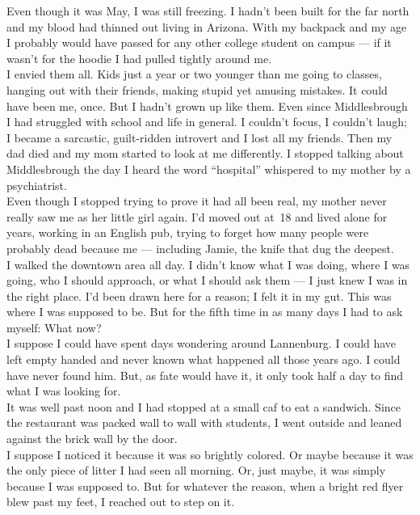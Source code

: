 \documentclass[a5paper]{scrartcl}
\begin{document}
Even though it was May, I was still freezing. I hadn't been built for the far north and my blood had thinned out living in Arizona. With my backpack and my age I probably would have passed for any other college student on campus --- if it wasn't for the hoodie I had pulled tightly around me.\\


I envied them all. Kids just a year or two younger than me going to classes, hanging out with their friends, making  stupid yet amusing mistakes. It could have been me, once. But I hadn't grown up like them. Even since Middlesbrough I had struggled with school and life in general. I couldn't focus, I couldn't laugh; I became a sarcastic, guilt-ridden introvert and I lost all my friends. Then my dad died and my mom started to look at me differently. I stopped talking about Middlesbrough the day I heard the word \enquote{hospital} whispered to my mother by a psychiatrist.\\


Even though I stopped trying to prove it had all been real, my mother never really saw me as her little girl again. I'd moved out at~18 and lived alone for years, working in an English pub, trying to forget how many people were probably dead because me --- including Jamie, the knife that dug the deepest.\\


I walked the downtown area all day. I didn't know what I was doing, where I was going, who I should approach, or what I should ask them --- I just knew I was in the right place. I'd been drawn here for a reason; I felt it in my gut. This was where I was supposed to be. But for the fifth time in as many days I had to ask myself: What now?\\


I suppose I could have spent days wondering around Lannenburg. I could have left empty handed and never known what happened all those years ago. I could have never found him. But, as fate would have it, it only took half a day to find what I was looking for.\\


It was well past noon and I had stopped at a small caf     to eat a sandwich. Since the restaurant was packed wall to wall with students, I went outside and leaned against the brick wall by the door.\\


I suppose I noticed it because it was so brightly colored. Or maybe because it was the only piece of litter I had seen all morning. Or, just maybe, it was simply because I was supposed to. But for whatever the reason, when a bright red flyer blew past my feet, I reached out to step on it.\\
\end{document}
